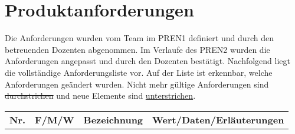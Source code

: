 \section{Produktanforderungen}
\label{sec:produktanforderungen}

Die Anforderungen wurden vom Team im PREN1 definiert und durch den betreuenden Dozenten abgenommen. Im Verlaufe des PREN2 wurden die Anforderungen angepasst und durch den Dozenten bestätigt. Nachfolgend liegt die vollständige Anforderungsliste vor. Auf der Liste ist erkennbar, welche Anforderungen geändert wurden. Nicht mehr gültige Anforderungen sind \sout{durchstrichen} und neue Elemente sind \uline{unterstrichen}.

\renewcommand{\arraystretch}{1.5}
\begin{longtable}[l]{|l|c|l|p{8.5cm}|}
	\hline
	\textbf{Nr.} & \textbf{F/M/W} & \textbf{Bezeichnung} & \textbf{Wert/Daten/Erläuterungen} \endhead
	

\end{longtable}
